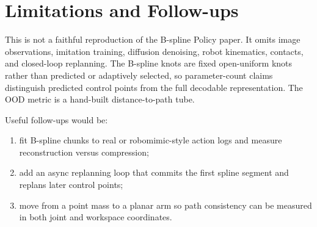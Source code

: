 \documentclass[11pt]{article}
\begin{document}
\section{Limitations and Follow-ups}

This is not a faithful reproduction of the B-spline Policy paper. It omits image observations, imitation training, diffusion denoising, robot kinematics, contacts, and closed-loop replanning. The B-spline knots are fixed open-uniform knots rather than predicted or adaptively selected, so parameter-count claims distinguish predicted control points from the full decodable representation. The OOD metric is a hand-built distance-to-path tube.

Useful follow-ups would be:
\begin{enumerate}[leftmargin=1.5em]
  \item fit B-spline chunks to real or robomimic-style action logs and measure reconstruction versus compression;
  \item add an async replanning loop that commits the first spline segment and replans later control points;
  \item move from a point mass to a planar arm so path consistency can be measured in both joint and workspace coordinates.
\end{enumerate}
\end{document}
